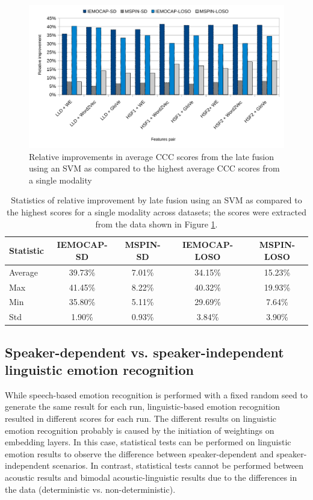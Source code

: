 \begin{figure}[htpb]
\centering
\includegraphics[width=\textwidth]{../fig/improvement.pdf}
\caption{Relative improvements in average CCC scores from the late fusion using
an SVM as compared to the highest average CCC scores from a single modality}
\label{fig:relative-improvement}
\end{figure}

\begin{table}[htpb]
\caption{Statistics of relative improvement by late fusion using an SVM as
compared to the highest scores for a single modality across datasets; the
scores were extracted from the data shown in Figure
\ref{fig:relative-improvement}.}   
\begin{center}
 \label{tab:relative-improvement}
 \begin{tabular}{l c c c c}
 \hline 
Statistic & IEMOCAP-SD & MSPIN-SD & IEMOCAP-LOSO & MSPIN-LOSO \\
\hline \hline
Average& 39.73\%   & 7.01\%    & 34.15\%   & 15.23\% \\
Max    & 41.45\%   & 8.22\%    & 40.32\%   & 19.93\% \\
Min    & 35.80\%   & 5.11\%    & 29.69\%   & 7.64\% \\
Std    & 1.90\%    & 0.93\%    & 3.84\%    & 3.90\% \\
 \hline
 \end{tabular}
\end{center}
\end{table} 

\subsection{Speaker-dependent vs. speaker-independent linguistic emotion recognition}
\label{subsect:sd_loso}
While speech-based emotion recognition is performed with a fixed random seed to
generate the same result for each run, linguistic-based emotion recognition
resulted in different scores for each run. The different results on linguistic
emotion recognition probably is caused by the initiation of weightings on
embedding layers. In this case, statistical tests can be performed on
linguistic emotion results to observe the difference between speaker-dependent
and speaker-independent scenarios. In contrast, statistical tests cannot be
performed between acoustic results and bimodal acoustic-linguistic results due
to the differences in the data (deterministic vs. non-deterministic). 

